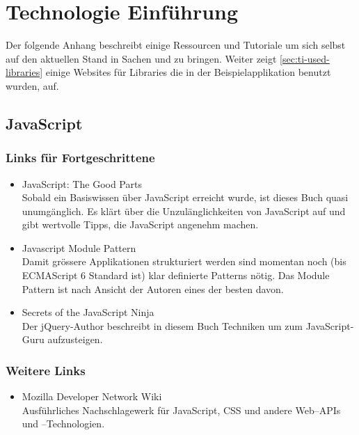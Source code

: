 \chapter{Technologie Einführung}

Der folgende Anhang beschreibt einige Ressourcen und Tutoriale um sich selbst
auf den aktuellen Stand in Sachen  und  zu bringen.
Weiter zeigt \ref{sec:ti-used-libraries} einige Websites für Libraries die in der
Beispielapplikation benutzt wurden, auf.

\section{JavaScript}
\label{sec:ti-javascript}

\subsection*{Links für Fortgeschrittene}
\begin{itemize}
	\item JavaScript: The Good Parts \cite{Crockford:2008:JGP:1386753} \\
		Sobald ein Basiswissen über JavaScript erreicht wurde, ist dieses Buch
		quasi unumgänglich. Es klärt über die Unzulänglichkeiten von JavaScript
		auf und gibt wertvolle Tipps, die JavaScript angenehm machen.
	\item Javascript Module Pattern \cite{JSModulePattern} \\
		Damit grössere Applikationen strukturiert werden sind momentan noch (bis ECMAScript 6 Standard ist) klar definierte Patterns nötig.
		Das Module Pattern ist nach Ansicht der Autoren eines der besten davon.
	\item Secrets of the JavaScript Ninja \cite{resig2012secrets} \\
		Der jQuery-Author beschreibt in diesem Buch Techniken um zum
		JavaScript-Guru aufzusteigen.
\end{itemize}

\subsection*{Weitere Links}
\begin{itemize}
	\item Mozilla Developer Network Wiki \cite{MDN} \\
		Ausführliches Nachschlagewerk für JavaScript, CSS und
		andere Web--APIs und --Technologien.
\end{itemize}

